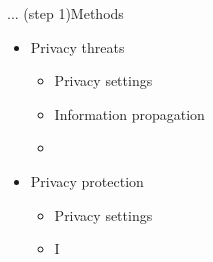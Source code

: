 \begin{frame}{... (step 1)}{Methods}
	\begin{itemize}
		\item Privacy threats
			\begin{itemize}
				\item Privacy settings
				\item Information propagation
				\item 
			\end{itemize}
		\item Privacy protection
			\begin{itemize}
				\item Privacy settings
				\item I
			\end{itemize}
	\end{itemize}
	

\end{frame}
